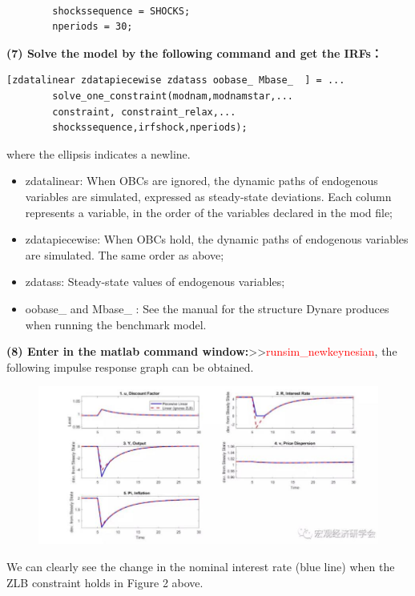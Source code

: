 \documentclass[10pt,math=newtx,citestyle=gb7714-2015,bibstyle=gb7714-2015]{elegantbook}
\begin{document}
{\begin{itemize}
\begin{lstlisting}[frame=shadowbox]
		
		shockssequence = SHOCKS;
		nperiods = 30;
	\end{lstlisting}
	
	\textbf{(7) Solve the model by the following command and get the IRFs：}
	
	\begin{lstlisting}[frame=shadowbox]
		[zdatalinear zdatapiecewise zdatass oobase_ Mbase_  ] = ...
		solve_one_constraint(modnam,modnamstar,...
		constraint, constraint_relax,...
		shockssequence,irfshock,nperiods);
	\end{lstlisting}
	
      where  the ellipsis indicates a newline.
	\begin{itemize}
		\item zdatalinear: When OBCs are ignored, the dynamic paths of endogenous variables are simulated, expressed as steady-state deviations. Each column represents a variable, in the order of the variables declared in the mod file;
		
		\item zdatapiecewise: When OBCs hold, the dynamic paths of endogenous variables are simulated. The same order as above;
		
		\item zdatass: Steady-state values of endogenous variables;
		
		\item oobase\_ and Mbase\_ : See the manual for the structure Dynare produces when running the benchmark model.
	\end{itemize}
	
	\textbf{(8) Enter in the matlab command window:}>>\textcolor{red}{runsim\_newkeynesian}, the following impulse response graph can be obtained.
	
	
	\begin{figure}[htbp!]
		\centering
		\includegraphics[width=0.8\linewidth]{FIG/occbinirf}
		\centering
	\end{figure}
	
	We can clearly see the change in the nominal interest rate (blue line) when the ZLB constraint holds in Figure 2 above.
\end{itemize}

}
\end{document}
